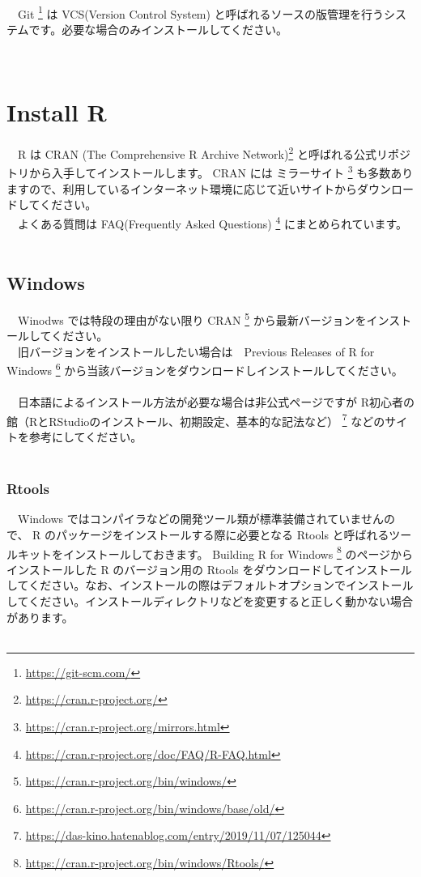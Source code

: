 \documentclass[
  12pt,
]{book}
\DeclareRobustCommand{\href}[2]{#2\footnote{\url{#1}}}
\begin{document}
　\\
　\href{https://git-scm.com/}{Git } は VCS(Version Control System) と呼ばれるソースの版管理を行うシステムです。必要な場合のみインストールしてください。

　

\hypertarget{install-r}{%
\section{Install R}\label{install-r}}

　R は \href{https://cran.r-project.org/}{CRAN (The Comprehensive R Archive Network)} と呼ばれる公式リポジトリから入手してインストールします。 CRAN には \href{https://cran.r-project.org/mirrors.html}{ミラーサイト } も多数ありますので、利用しているインターネット環境に応じて近いサイトからダウンロードしてください。\\
　よくある質問は \href{https://cran.r-project.org/doc/FAQ/R-FAQ.html}{FAQ(Frequently Asked Questions) } にまとめられています。\\
　

\hypertarget{windows}{%
\subsection{Windows}\label{windows}}

　Winodws では特段の理由がない限り \href{https://cran.r-project.org/bin/windows/}{CRAN } から最新バージョンをインストールしてください。\\
　旧バージョンをインストールしたい場合は　\href{https://cran.r-project.org/bin/windows/base/old/}{Previous Releases of R for Windows } から当該バージョンをダウンロードしインストールしてください。\\
　\\
　日本語によるインストール方法が必要な場合は非公式ページですが \href{https://das-kino.hatenablog.com/entry/2019/11/07/125044}{R初心者の館（RとRStudioのインストール、初期設定、基本的な記法など） } などのサイトを参考にしてください。\\
　

\hypertarget{rtools}{%
\subsubsection{Rtools}\label{rtools}}

　Windows ではコンパイラなどの開発ツール類が標準装備されていませんので、 R のパッケージをインストールする際に必要となる Rtools と呼ばれるツールキットをインストールしておきます。 \href{https://cran.r-project.org/bin/windows/Rtools/}{Building R for Windows } のページからインストールした R のバージョン用の Rtools をダウンロードしてインストールしてください。なお、インストールの際はデフォルトオプションでインストールしてください。インストールディレクトリなどを変更すると正しく動かない場合があります。\\
　
\end{document}

